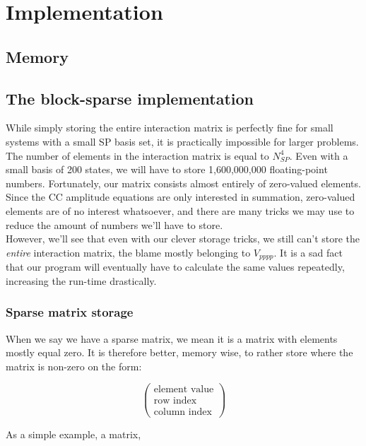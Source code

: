 \documentclass[10pt]{report}
\begin{document}
	\chapter{Implementation}
	
	\section{Memory}
	
	\section{The block-sparse implementation}
	While simply storing the entire interaction matrix is perfectly fine for small systems with a small SP basis set, it is practically impossible for larger problems. The number of elements in the interaction matrix is equal to $N_{SP}^4$. Even with a small basis of 200 states, we will have to store 1,600,000,000 floating-point numbers. Fortunately, our matrix consists almost entirely of zero-valued elements. Since the CC amplitude equations are only interested in summation, zero-valued elements are of no interest whatsoever, and there are many tricks we may use to reduce the amount of numbers we'll have to store.\\
	
	However, we'll see that even with our clever storage tricks, we still can't store the \emph{entire} interaction matrix, the blame mostly belonging to $V_{pppp}$. It is a sad fact that our program will eventually have to calculate the same values repeatedly, increasing the run-time drastically.\\
	
	\subsection{Sparse matrix storage}
	When we say we have a sparse matrix, we mean it is a matrix with elements mostly equal zero. It is therefore better, memory wise, to rather store where the matrix is non-zero on the form:
	
	\begin{equation*}
		\begin{pmatrix}
			\text{element value} \\ \text{row index} \\ \text{column index}
		\end{pmatrix}
	\end{equation*}
	
	As a simple example, a matrix,
	
\end{document}
